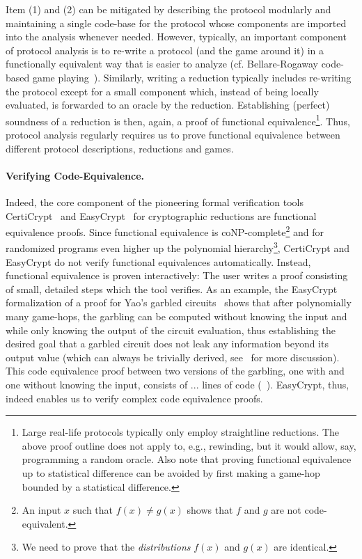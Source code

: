 Item (1) and (2) can be mitigated by describing the protocol
modularly and maintaining a single code-base for the protocol
whose components are imported into the analysis whenever needed.
However, typically, an important component of protocol analysis 
is to re-write a protocol (and the game around it) in a 
functionally equivalent way that is easier
to analyze (cf. Bellare-Rogaway code-based
game playing~\cite{EC:BelRog06}).
Similarly, writing a reduction typically includes re-writing the protocol 
except for a small component which, instead of being locally evaluated, 
is forwarded to an oracle by the reduction. Establishing (perfect) soundness of 
a reduction is then, again, a proof of functional equivalence\footnote{Large 
real-life protocols typically only employ straightline reductions. The 
above proof outline does not apply to, e.g., rewinding, but it would 
allow, say, programming a random oracle. Also note that proving functional equivalence 
up to statistical difference can be avoided by first making a game-hop
bounded by a statistical difference.}. Thus, protocol analysis regularly
requires us to prove functional equivalence between different protocol descriptions,
reductions and games.

\paragraph{Verifying Code-Equivalence.}
Indeed, the core component of the pioneering formal
verification tools CertiCrypt~\cite{X} and EasyCrypt~\cite{X} for 
cryptographic reductions are functional equivalence proofs. Since functional 
equivalence is coNP-complete\footnote{An input $x$ such that 
$f(x)\neq g(x)$ shows that $f$ and $g$ are not code-equivalent.} and 
for randomized programs even higher up the polynomial hierarchy\footnote{We need to prove that the \emph{distributions} $f(x)$ and $g(x)$ are identical.}, 
CertiCrypt and EasyCrypt do not verify functional equivalences automatically.
Instead, functional equivalence is proven interactively: The user writes
a proof consisting of small, detailed steps which the tool verifies.
As an example, the EasyCrypt formalization
of a proof for Yao's garbled circuits~\cite{X} shows that after polynomially many game-hops, the garbling can be computed without knowing the input and while only knowing the output of the circuit evaluation, thus establishing the desired goal that a garbled circuit does not leak any information beyond its output value (which can
always be trivially derived, see~\cite{X} for more discussion). This code equivalence proof between two versions of the garbling, one with and one without
knowing the input, consists of ... lines of code (~\cite[page x]{}). EasyCrypt,
 thus, indeed enables us to verify complex code equivalence proofs.

